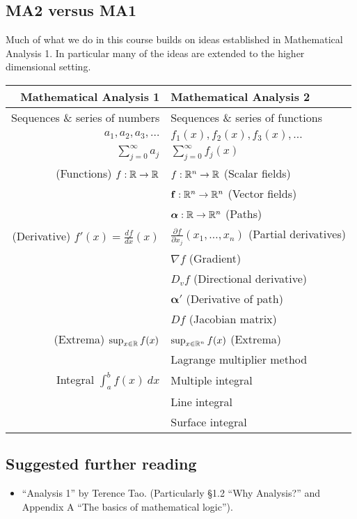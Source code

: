 \subsection*{MA2 versus MA1}

Much of what we do in this course builds on ideas established in Mathematical Analysis 1.
In particular many of the ideas are extended to the higher dimensional setting.

\begin{center}
  \begin{tabular}{r | l}
    \textbf{Mathematical Analysis 1}
     &
    \textbf{Mathematical Analysis 2}  \\
    \midrule
    Sequences \& series of numbers
     &
    Sequences \& series  of functions \\
    \(a_1, a_2, a_3,\ldots \)
     &
    \(f_1(x), f_2(x), f_3(x),\ldots \)
    \\
    \(\sum_{j=0}^{\infty} a_j\)
     &
    \(\sum_{j=0}^{\infty} f_j(x)\)
    \\
    \midrule
    (Functions) \(f:\mathbb{R} \to \mathbb{R}\)
     &
    \(f:\mathbb{R}^n \to \mathbb{R}\) (Scalar fields)
    \\
     &
    \(\mathbf{f}:\mathbb{R}^n \to \mathbb{R}^n\) (Vector fields)
    \\
     &
    \(\boldsymbol{\alpha}:\mathbb{R} \to \mathbb{R}^n\) (Paths)
    \\
    \midrule
    (Derivative) \( f'(x) = \frac{df}{dx}(x)\)
     &
    \( \frac{\partial f}{\partial x_j}(x_1,\ldots,x_n)\) (Partial derivatives)
    \\
     &
    \(\nabla f\) (Gradient)
    \\
     &
    \(D_v f\) (Directional derivative)
    \\
     &
    \(\boldsymbol{\alpha}'\) (Derivative of path)
    \\
     &
    \(Df\) (Jacobian matrix)
    \\
    \midrule
    (Extrema) \(\sup_{x\in \mathbb{R}} f(x)\)
     &
    \(\sup_{x\in \mathbb{R}^n} f(x)\) (Extrema)
    \\
     &
    Lagrange multiplier method
    \\
    \midrule
    Integral \(\int_{a}^{b} f(x) \ dx\)
     &
    Multiple integral
    \\
     &
    Line integral
    \\
     &
    Surface integral
  \end{tabular}
\end{center}


\subsection*{Suggested further reading}

\begin{itemize}
  \item ``Analysis 1'' by Terence Tao.
        (Particularly \S 1.2 ``Why Analysis?'' and Appendix A ``The basics of mathematical logic'').
\end{itemize}